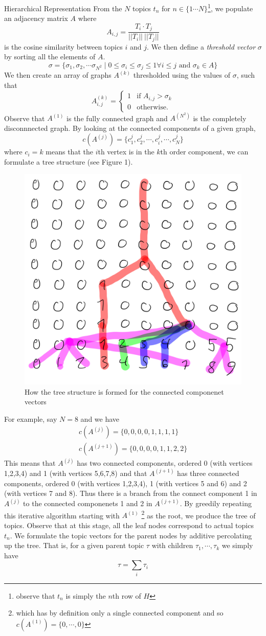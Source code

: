 \documentclass[12pt]{pom_thesis}
\begin{document}
\begin{chapter}{Hierarchical Representation}
From the $N$ topics $t_n$ for $n \in \{1\cdots N\}$\footnote{observe that $t_n$ is simply the $n$th row of $H$}, we populate an adjacency matrix $A$ where $$A_{i,j} = \frac{T_i \cdot T_j}{||T_i|| \ ||T_j||}$$ is the cosine similarity between topics $i$ and $j$. We then define a \emph{threshold vector} $\sigma$ by sorting all the elements of $A$. $$\sigma = \{\sigma_1, \sigma_2, \cdots \sigma_{N^2} \mid0 \leq \sigma_{i} \leq \sigma_j \leq 1 \forall i \leq j\text{ and }\sigma_k \in A\}$$
We then create an array of graphs $A^{(k)}$ thresholded using the values of $\sigma$, such that  \[
A^{(k)}_{i,j} =
\begin{cases}
1 & \text{if } A_{i,j} >\sigma_k\\
0 & \text{otherwise.}
\end{cases}
\]
Observe that $A^{(1)}$ is the fully connected graph and $A^{(N^2)}$ is the completely disconnnected graph.
By looking at the connected components  of a given graph,
$$c(A^{(j)})=\{c^j_1, c^j_2,\cdots,c^j_i,\cdots,c^j_N\}$$
where $c_i =k$ means that the $i$th vertex is in the $k$th order component, we can formulate a tree structure (see Figure 1).
\begin{figure}
	\centering
	\includegraphics[width=.5\textwidth]{tree}
	\caption{How the tree structure is formed for the connected componenet vectors}
\end{figure}
For example, say $N=8$ and we have
\begin{align*}
c(A^{(j)})=\{0, 0, 0 ,0, 1 ,1 ,1, 1\}\\
c(A^{(j+1)})=\{0, 0, 0 ,0, 1 ,1 ,2, 2\}
\end{align*}
This means that $A^{(j)}$ has two connected components, ordered 0 (with vertices 1,2,3,4) and 1 (with vertices 5,6,7,8) and that $A^{(j+1)}$ has three connected components, ordered 0 (with vertices 1,2,3,4), 1 (with vertices 5 and 6) and 2 (with vertices 7 and 8).  Thus there is a branch from the connect component 1 in $A^{(j)}$ to the connected componenets 1 and 2 in $A^{(j+1)}$. By greedily repeating this iterative algorithm starting with $A^{(1)}$ \footnote{which has by definition only a single connected component and so $c(A^{(1)})=\{0, \cdots, 0\}$} as the root, we produce the tree of topics. Observe that at this stage, all the leaf nodes correspond to actual topics $t_n$. We formulate the topic vectors for the parent nodes by additive percolating up the tree. That is, for a given parent topic $\tau$ with children $\tau_1, \cdots, \tau_k$ we simply have 
$$\tau =\sum_i \tau_i $$

\end{chapter}
\end{document}
